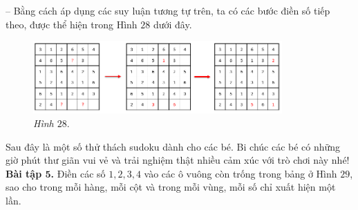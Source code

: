 	-- Bằng cách áp dụng các suy luận tương tự trên, ta có các bước điền số tiếp theo, được thể hiện trong Hình $28$ dưới đây.
	\begin{figure}[H]
		\centering
		\vspace*{-10pt}
		\captionsetup{labelformat= empty, justification=centering}
		\includegraphics[width=0.85\textwidth]{pic17}
		\vspace*{-5pt}
		\caption{\small\textit{Hình $28.$}}
		\vspace*{-5pt}
	\end{figure}
	Sau đây là một số thử thách sudoku dành cho các bé. Bi chúc các bé có những giờ phút thư giãn vui vẻ và trải nghiệm thật nhiều cảm xúc với trò chơi này nhé!
	\vskip 0.15cm
	\textbf{Bài tập $\pmb{5}$.} Điền các số $1, 2, 3, 4$ vào các ô vuông còn trống trong bảng ở Hình $29$, sao cho trong mỗi hàng, mỗi cột và trong mỗi vùng, mỗi số chỉ xuất hiện một lần.
